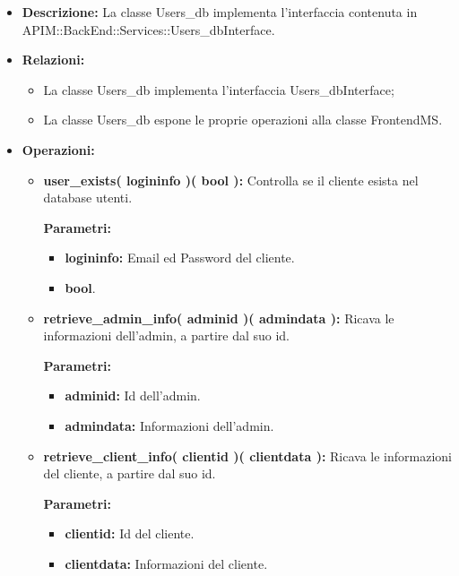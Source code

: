 \begin{itemize}
	\item \textbf{Descrizione:} La classe Users\_db implementa l'interfaccia contenuta in APIM::BackEnd::Services::Users\_dbInterface.
	\item \textbf{Relazioni:}
		\begin{itemize}
			\item La classe Users\_db implementa l'interfaccia Users\_dbInterface;
			\item La classe Users\_db espone le proprie operazioni alla classe FrontendMS.
		\end{itemize}
	\item \textbf{Operazioni:}
		\begin{itemize}
		
			\item \textbf{user\_exists( logininfo )( bool ):} Controlla se il cliente esista nel database utenti.
				\begin{description}
    				\item[\textbf{Parametri:}]
				\end{description}
				\begin{itemize}
					\item \textbf{logininfo:} Email ed Password del cliente.
					\item \textbf{bool}.
				\end{itemize}
				
			\item \textbf{retrieve\_admin\_info( adminid )( admindata ):} Ricava le informazioni dell'admin, a partire dal suo id.
				\begin{description}
    				\item[\textbf{Parametri:}]
				\end{description}
				\begin{itemize}
					\item \textbf{adminid:} Id dell'admin.
					\item \textbf{admindata:} Informazioni dell'admin.
				\end{itemize}
				
			\item \textbf{retrieve\_client\_info( clientid )( clientdata ):} Ricava le informazioni del cliente, a partire dal suo id.
				\begin{description}
    				\item[\textbf{Parametri:}]
				\end{description}
				\begin{itemize}
					\item \textbf{clientid:} Id del cliente.
					\item \textbf{clientdata:} Informazioni del cliente.
				\end{itemize}
				

\end{itemize}
\end{itemize}
